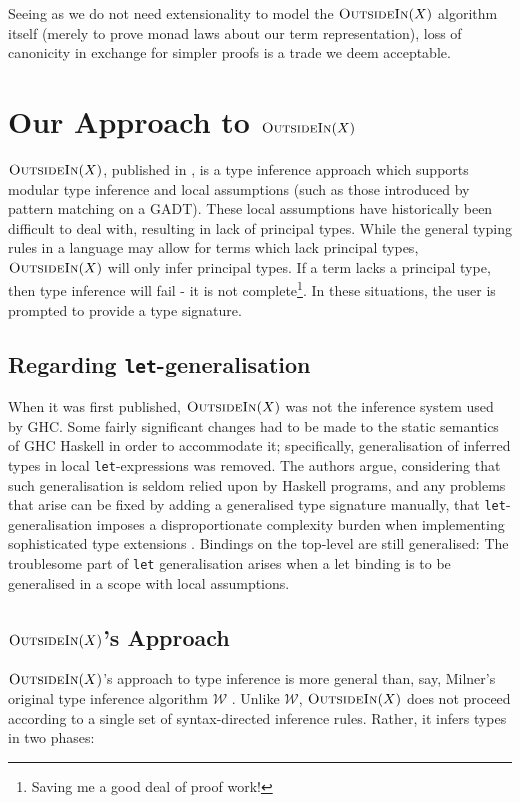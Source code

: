 \documentclass[a4paper]{jfp}
\newcommand{\outsidein}{\textsc{OutsideIn}(X)}
\begin{document}
Seeing as we do not need extensionality to model the $\outsidein$ algorithm itself (merely to prove monad laws about our term representation), loss of canonicity in exchange for simpler proofs is a trade we deem acceptable.


\section{Our Approach to $\outsidein$}

$\outsidein$, published in \cite{Vytiniotis:2011:OMT:2139531.2139533}, is a type inference approach which supports modular type inference and local assumptions (such as those introduced by pattern matching on a GADT). These local assumptions have historically been difficult to deal with, resulting in lack of principal types. While the general typing rules in a language may allow for terms which lack principal types, $\outsidein$ will only infer principal types. If a term lacks a principal type, then type inference will fail - it is not complete\footnote{Saving me a good deal of proof work!}. In these situations, the user is prompted to provide a type signature.

\subsection{Regarding {\tt let}-generalisation}

When it was first published, $\outsidein$ was not the inference system used by GHC. Some fairly significant changes had to be made to the static semantics of GHC Haskell in order to accommodate it; specifically, generalisation of inferred types in local {\tt let}-expressions was removed. The authors argue, considering that such generalisation is seldom relied upon by Haskell programs, and any problems that arise can be fixed by adding a generalised type signature manually, that {\tt let}-generalisation imposes a disproportionate complexity burden when implementing sophisticated type extensions \cite{Vytiniotis:2010ja}. Bindings on the top-level are still generalised: The troublesome part of {\tt let} generalisation arises when a let binding is to be generalised in a scope with local assumptions. 

\subsection{$\outsidein$'s Approach}

$\outsidein$'s approach to type inference is more general than, say, Milner's original type inference algorithm $\mathcal{W}$ \cite{Milner78atheory}. Unlike $\mathcal{W}$, $\outsidein$ does not proceed according to a single set of syntax-directed inference rules. Rather, it infers types in two phases:
\end{document}
